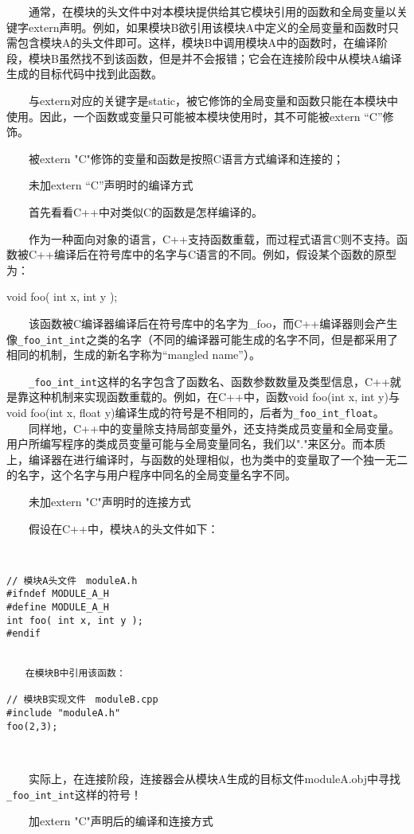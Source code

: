 　　通常，在模块的头文件中对本模块提供给其它模块引用的函数和全局变量以关键字extern声明。例如，如果模块B欲引用该模块A中定义的全局变量和函数时只需包含模块A的头文件即可。这样，模块B中调用模块A中的函数时，在编译阶段，模块B虽然找不到该函数，但是并不会报错；它会在连接阶段中从模块A编译生成的目标代码中找到此函数。

　　与extern对应的关键字是static，被它修饰的全局变量和函数只能在本模块中使用。因此，一个函数或变量只可能被本模块使用时，其不可能被extern “C”修饰。

　　被extern "C"修饰的变量和函数是按照C语言方式编译和连接的；

　　未加extern “C”声明时的编译方式

　　首先看看C++中对类似C的函数是怎样编译的。

　　作为一种面向对象的语言，C++支持函数重载，而过程式语言C则不支持。函数被C++编译后在符号库中的名字与C语言的不同。例如，假设某个函数的原型为：

void foo( int x, int y );


　　该函数被C编译器编译后在符号库中的名字为\_foo，而C++编译器则会产生像\verb|_foo_int_int|之类的名字（不同的编译器可能生成的名字不同，但是都采用了相同的机制，生成的新名字称为“mangled name”）。

　　\verb|_foo_int_int|这样的名字包含了函数名、函数参数数量及类型信息，C++就是靠这种机制来实现函数重载的。例如，在C++中，函数void foo(int x, int y)与void foo(int x, float y)编译生成的符号是不相同的，后者为\verb|_foo_int_float|。
　　同样地，C++中的变量除支持局部变量外，还支持类成员变量和全局变量。用户所编写程序的类成员变量可能与全局变量同名，我们以"."来区分。而本质上，编译器在进行编译时，与函数的处理相似，也为类中的变量取了一个独一无二的名字，这个名字与用户程序中同名的全局变量名字不同。

　　未加extern "C"声明时的连接方式

　　假设在C++中，模块A的头文件如下：
\begin{verbatim}
　

// 模块A头文件　moduleA.h
#ifndef MODULE_A_H
#define MODULE_A_H
int foo( int x, int y );
#endif


　　在模块B中引用该函数：

// 模块B实现文件　moduleB.cpp
#include "moduleA.h"
foo(2,3);
\end{verbatim} 　

　　实际上，在连接阶段，连接器会从模块A生成的目标文件moduleA.obj中寻找\verb|_foo_int_int|这样的符号！

　　加extern "C"声明后的编译和连接方式

